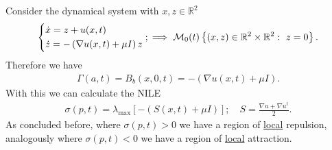 \begin{ex}
	Consider the dynamical system with $x,z\in \mathbb{R}^{2}$
	\begin{align}
		\begin{dcases}
			\dot{x} = z + u(x,t) \\
			\dot{z} = - \left( \nabla u(x,t) + \mu I \right) z
		\end{dcases}
		; \implies \mathcal{M}_{0}(t) \left\{ (x,z) \in \mathbb{R}^{2}\times \mathbb{R}^{2}:\ z =0\right\}.	
	\end{align}
Therefore we have 
\begin{align}
	\Gamma(a,t) = B_{b}(x,0,t) = - \left(\nabla u(x,t) + \mu I \right).
\end{align}
With this we can calculate the NILE
\begin{align}
	\sigma(p,t) = \lambda _{ \textrm{max} } \left[ - (S(x,t) + \mu I ) \right]; \quad S = \frac{\nabla u + \nabla u^{t}}{2}.
\end{align}
As concluded before, where $\sigma(p,t)>0$ we have a region of \underline{local} repulsion, analogously where $\sigma(p,t) <0$ we have a region of \underline{local} attraction.
\end{ex}


